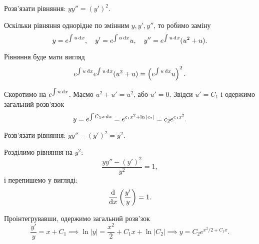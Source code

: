 \begin{example}
	Розв'язати рівняння: $y  y'' = (y')^2$.
\end{example}

\begin{solution}
	Оскільки рівняння однорідне по змінним $y, y', y''$, то робимо заміну \[ y = e^{\int u \mathop{}\!\mathrm{d} x}, \quad y' = e^{\int u \mathop{}\!\mathrm{d} x} u, \quad y'' = e^{\int u \mathop{}\!\mathrm{d} x} (u^2 +u). \]
	
	Рівняння буде мати вигляд \[ e^{\int u \mathop{}\!\mathrm{d} x}  e^{\int u \mathop{}\!\mathrm{d} x} (u^2 + u) = \left( e^{\int u \mathop{}\!\mathrm{d} x} u\right)^2.\]
	
	Скоротимо на $e^{\int u \mathop{}\!\mathrm{d} x}$. Маємо $u^2 + u' = u^2$, або $u'=0$. Звідси $u'=C_1$ і одержимо загальний розв'язок \[ y = e^{\int C_1 x \mathop{}\!\mathrm{d} x} = e^{c_1 x^2 + \ln |c_2|}=c_2 e^{c_1x^2}.\]
\end{solution}

\begin{example}
	Розв'язати рівняння: $y  y'' - (y')^2 = y^2$.
\end{example} 

\begin{solution}
	Розділимо рівняння на $y^2$: \[ \frac{y  y'' - (y')^2}{y^2} = 1,\] і перепишемо у вигляді: \[ \frac{\mathop{}\!\mathrm{d}}{\mathop{}\!\mathrm{d} x} \left( \frac{y'}{y}\right)=1.\]
	
	Проінтегрувавши, одержимо загальний розв'зок \[\frac{y'}{y}=x+C_1\implies \ln |y| = \frac{x^2}{2}+C_1x+\ln |C_2|\implies y=C_2 e^{x^2/2+C_1x}.\]
\end{solution}


